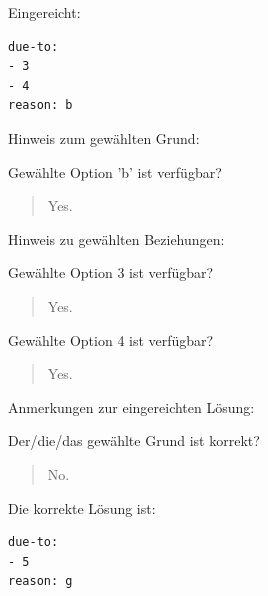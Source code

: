 Eingereicht:


\begin{verbatim}
due-to:
- 3
- 4
reason: b
\end{verbatim}


Hinweis zum gewählten Grund:

Gewählte Option 'b' ist verfügbar?\begin{quote}Yes.\end{quote}Hinweis zu gewählten Beziehungen:

Gewählte Option 3 ist verfügbar?\begin{quote}Yes.\end{quote}Gewählte Option 4 ist verfügbar?\begin{quote}Yes.\end{quote}Anmerkungen zur eingereichten Lösung:

Der/die/das gewählte Grund ist korrekt?\begin{quote}No.\end{quote}Die korrekte Lösung ist:
\begin{verbatim}
due-to:
- 5
reason: g

\end{verbatim}



